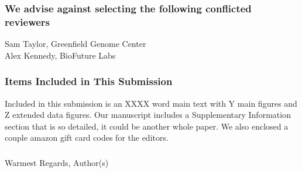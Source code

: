 \documentclass[11pt]{article}
\begin{document}
\subsubsection*{We advise against selecting the following conflicted reviewers}
\noindent Sam Taylor, Greenfield Genome Center\\
Alex Kennedy, BioFuture Labs

\subsubsection{Items Included in This Submission}
\noindent Included in this submission is an XXXX word main text with Y main figures and Z extended data figures. Our manuscript includes a Supplementary Information section that is so detailed, it could be another whole paper. We also enclosed a couple amazon gift card codes for the editors. 

%
\subsubsection{}
Warmest Regards,
\newline
Author(s)

\end{document}
